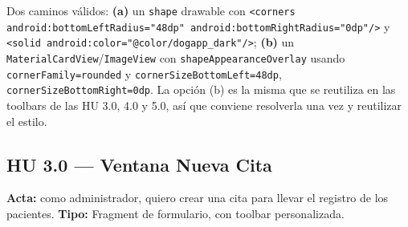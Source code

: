\documentclass[11pt,letterpaper]{article}
\newcommand{\code}[1]{\texttt{\small #1}}
\begin{document}
\begin{techbox}
Dos caminos v\'alidos: \textbf{(a)} un \code{shape} drawable con
\code{<corners android:\allowbreak{}bottomLeftRadius=\allowbreak{}"48dp" android:\allowbreak{}bottomRightRadius=\allowbreak{}"0dp"/>}
y \code{<solid android:\allowbreak{}color="@color/\allowbreak{}dogapp\_dark"/\allowbreak{}>}; \textbf{(b)} un
\code{MaterialCardView}/\code{ImageView} con
\code{shapeAppearanceOverlay} usando \code{cornerFamily=\allowbreak{}rounded} y
\code{cornerSizeBottomLeft=\allowbreak{}48dp}, \code{cornerSizeBottomRight=\allowbreak{}0dp}. La opci\'on
(b) es la misma que se reutiliza en las toolbars de las HU 3.0, 4.0 y 5.0, as\'i
que conviene resolverla una vez y reutilizar el estilo.
\end{techbox}

\subsection{HU 3.0 --- Ventana Nueva Cita}

\textbf{Acta:} como administrador, quiero crear una cita para llevar el registro
de los pacientes. \textbf{Tipo:} Fragment de formulario, con toolbar personalizada.
\end{document}
